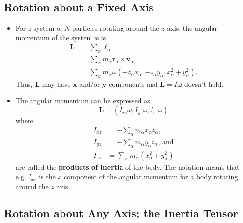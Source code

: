 \documentclass{article}
\renewcommand{\vec}[1]{\boldsymbol{\mathbf{#1}}}
\begin{document}
\subsection{Rotation about a Fixed Axis}

\begin{itemize}
  \item For a system of $N$ particles rotating around the $z$ axis, the angular momentum of the system is is \begin{align*}
          \vec{L} & = \sum_\alpha \vec{\ell}_\alpha                                                                  \\
                  & =  \sum_\alpha m_\alpha \vec{r}_\alpha \times \vec{v}_\alpha                                     \\
                  & = \sum_\alpha m_\alpha \omega (-z_\alpha x_\alpha, -z_\alpha y_\alpha, x_\alpha^2 + y_\alpha^2).
        \end{align*} Thus, $\vec{L}$ may have $\vec{x}$ and/or $\vec{y}$ components and $\vec{L} = I \vec{\omega}$ doesn't hold.

  \item The angular momentum can be expressed as \[\vec{L} = (I_{xz} \omega, I_{yz} \omega, I_{zz} \omega)\] where \begin{align*}
          I_{xz} & = -\sum_\alpha m_\alpha x_\alpha z_\alpha \text{,}     \\
          I_{yz} & = -\sum_\alpha m_\alpha y_\alpha z_\alpha \text{, and} \\
          I_{zz} & = \sum_\alpha m_\alpha (x_\alpha^2 + y_\alpha^2)
        \end{align*} are called the \textbf{products of inertia} of the body. The notation means that e.g. $I_{xz}$ is the $x$ component of the angular momentum for a body rotating around the $z$ axis.
\end{itemize}

\subsection{Rotation about Any Axis; the Inertia Tensor}
\end{document}

